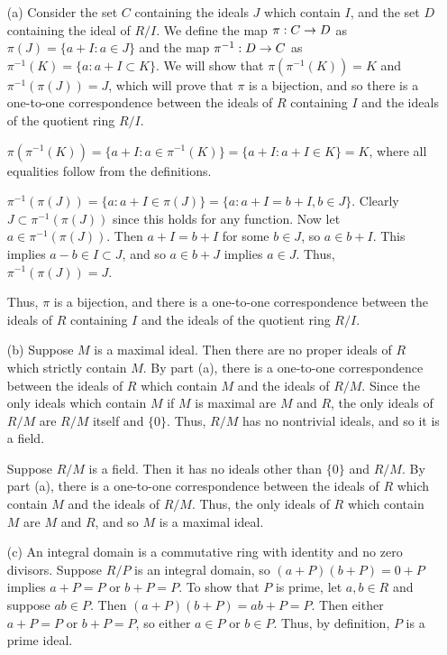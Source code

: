 \documentclass{hmwk}
\begin{document}
\begin{solution}
\begin{itemize}
    \item[(a)] Consider the set $C$ containing the ideals $J$ which contain $I$, and the set $D$ containing the ideal of $R/I$. We define the map $\pi: C \rightarrow D$ as $\pi(J) = \{a + I : a \in J\}$ and the map $\pi^{-1}: D \rightarrow C$ as $\pi^{-1}(K) = \{a : a + I \subset K\}$. We will show that $\pi(\pi^{-1}(K)) = K$ and $\pi^{-1}(\pi(J)) = J$, which will prove that $\pi$ is a bijection, and so there is a one-to-one correspondence between the ideals of $R$ containing $I$ and the ideals of the quotient ring $R/I$. 

    $\pi(\pi^{-1}(K)) = \{a + I : a \in \pi^{-1}(K)\} = \{a + I: a + I \in K\} = K$, where all equalities follow from the definitions. 

    $\pi^{-1}(\pi(J)) = \{a : a + I \in \pi(J)\} = \{a : a + I = b + I, b \in J\}$. Clearly $J \subset \pi^{-1}(\pi(J))$ since this holds for any function. Now let $a \in \pi^{-1}(\pi(J))$. Then $a + I = b + I$ for some $b \in J$, so $a \in b + I$. This implies $a - b \in I \subset J$, and so $a \in b + J$ implies $a \in J$. Thus, $\pi^{-1}(\pi(J)) = J$. 

    Thus, $\pi$ is a bijection, and there is a one-to-one correspondence between the ideals of $R$ containing $I$ and the ideals of the quotient ring $R/I$. 

    \item[(b)] Suppose $M$ is a maximal ideal. Then there are no proper ideals of $R$ which strictly contain $M$. By part (a), there is a one-to-one correspondence between the ideals of $R$ which contain $M$ and the ideals of $R/M$. Since the only ideals which contain $M$ if $M$ is maximal are $M$ and $R$, the only ideals of $R/M$ are $R/M$ itself and $\{0\}$. Thus, $R/M$ has no nontrivial ideals, and so it is a field. 

    Suppose $R/M$ is a field. Then it has no ideals other than $\{0\}$ and $R/M$. By part (a), there is a one-to-one correspondence between the ideals of $R$ which contain $M$ and the ideals of $R/M$. Thus, the only ideals of $R$ which contain $M$ are $M$ and $R$, and so $M$ is a maximal ideal. 

    \item[(c)] An integral domain is a commutative ring with identity and no zero divisors. Suppose $R/P$ is an integral domain, so $(a + P)(b + P) = 0 + P$ implies $a + P = P$ or $b + P = P$. To show that $P$ is prime, let $a, b \in R$ and suppose $ab \in P$. Then $(a + P)(b + P) = ab + P = P$. Then either $a + P = P$ or $b + P = P$, so either $a \in P$ or $b \in P$. Thus, by definition, $P$ is a prime ideal. 


\end{itemize}
\end{solution}
\end{document}
